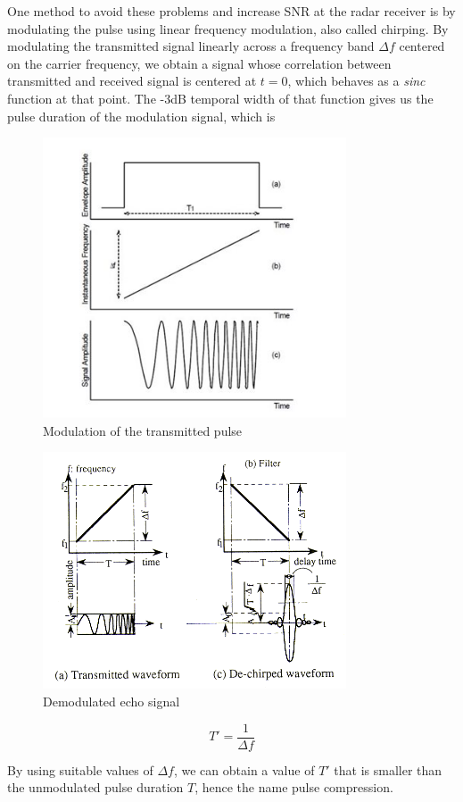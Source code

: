 \documentclass[english,purist]{ist-report}
\begin{document}
One method to avoid these problems and increase SNR at the radar receiver is by modulating the pulse using linear frequency modulation, also called chirping. By modulating the transmitted signal linearly across a frequency band $\Delta f$ centered on the carrier frequency, we obtain a signal whose correlation between transmitted and received signal is centered at $t = 0$, which behaves as a \textit{sinc} function at that point. The -3dB temporal width of that function gives us the pulse duration of the modulation signal, which is
\begin{figure}[ht]
\centering
\includegraphics[width=90mm]{modulacao_chirp.jpg}
\caption{Modulation of the transmitted pulse}
\label{modulacao_chirp}
\end{figure} 
\begin{figure}[ht]
\centering
\includegraphics[width=90mm]{graphics/chirped_result.PNG}
\caption{Demodulated echo signal}
\label{modulacao_chirp}
\end{figure} 
$$
T' = \frac{1}{\Delta f}
$$

By using suitable values of $\Delta f$, we can obtain a value of $T'$ that is smaller than the unmodulated pulse duration $T$, hence the name pulse compression.
\end{document}
